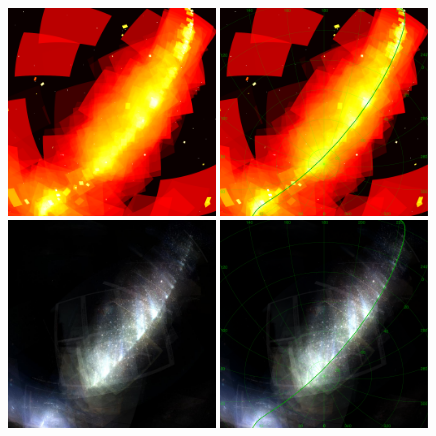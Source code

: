 \documentclass[12pt,preprint]{aastex}
\begin{document}
\clearpage
\begin{figure}
\begin{center}
\includegraphics[width=0.49\textwidth]{hya-footprint-1.png}\hspace{1pt}%
\includegraphics[width=0.49\textwidth]{hya-footprint-2.pdf}
\includegraphics[width=0.49\textwidth]{hya-coadd-1.jpg}\hspace{1pt}%
\includegraphics[width=0.49\textwidth]{hya-coadd-2.pdf}

\end{center}
\end{figure}
\end{document}
